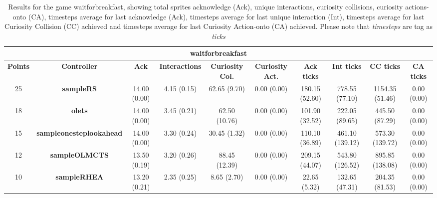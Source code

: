 \begin{table*}[!t]
\begin{center}
\begin{adjustbox}{width=1\textwidth}
\begin{tabular}{|c|c|c|c|c|c|c|c|c|c|}
\multicolumn{10}{c}{\textbf{waitforbreakfast}}\\
\hline
\textbf{Points} & \textbf{Controller} & \textbf{Ack} & \textbf{Interactions} & \textbf{Curiosity Col.} & \textbf{Curiosity Act.} & \textbf{Ack ticks} & \textbf{Int ticks} & \textbf{CC ticks} & \textbf{CA ticks}\\
\hline
25 & \textbf{sampleRS} & 14.00 (0.00) & 4.15 (0.15) & 62.65 (9.70) & 0.00 (0.00) & 180.15 (52.60) & 778.55 (77.10) & 1154.35 (51.46) & 0.00 (0.00)
 \\
\hline
18 & \textbf{olets} & 14.00 (0.00) & 3.45 (0.21) & 62.50 (10.76) & 0.00 (0.00) & 101.90 (32.52) & 222.05 (89.65) & 445.50 (87.29) & 0.00 (0.00)
 \\
\hline
15 & \textbf{sampleonesteplookahead} & 14.00 (0.00) & 3.30 (0.24) & 30.45 (1.32) & 0.00 (0.00) & 110.10 (36.89) & 461.10 (139.12) & 573.30 (139.72) & 0.00 (0.00)
 \\
\hline
12 & \textbf{sampleOLMCTS} & 13.50 (0.19) & 3.20 (0.26) & 88.45 (12.39) & 0.00 (0.00) & 209.15 (44.07) & 543.80 (126.52) & 895.85 (138.08) & 0.00 (0.00)
 \\
\hline
10 & \textbf{sampleRHEA} & 13.20 (0.21) & 2.35 (0.25) & 8.65 (2.70) & 0.00 (0.00) & 22.65 (5.32) & 132.65 (47.31) & 204.35 (81.53) & 0.00 (0.00)
 \\
\hline
\end{tabular}
\end{adjustbox}
\caption{Results for the game waitforbreakfast, showing total sprites acknowledge (Ack), unique interactions, curiosity collisions, curiosity actions-onto (CA), timesteps average for last acknowledge (Ack),  timesteps average for last unique interaction (Int), timesteps average for last Curiosity Collision (CC) achieved and timesteps average for last Curiosity Action-onto (CA) achieved. Please note that \textit{timesteps} are tag as \textit{ticks}}
\label{tab:weights}
\end{center}
\end{table*}
